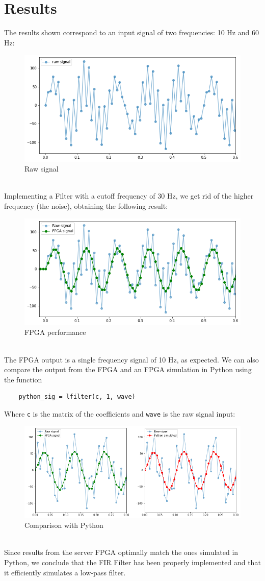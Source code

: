 \documentclass[11pt,a4paper,twocolumn]{IEEEtran}
\begin{document}
	\section{Results}
	The results shown correspond to an input signal of two frequencies: 10 Hz and 60 Hz: 
	\begin{figure}[h]
		\centering
		\includegraphics[width=.9\linewidth]{img/rawsig}
		\caption{Raw signal}
	\end{figure}\\
	Implementing a Filter with a cutoff frequency of 30 Hz, we get rid of the higher frequency (the noise), obtaining the following result:
	\begin{figure}[h]
		\centering
		\includegraphics[width=.9\linewidth]{img/fpgaresult}
		\caption{FPGA performance}
	\end{figure}\\
	The FPGA output is a single frequency signal of 10 Hz, as expected. We can also compare the output from the FPGA and an FPGA simulation in Python using the function
	\begin{lstlisting}
	python_sig = lfilter(c, 1, wave)
	\end{lstlisting}
	Where \texttt{c} is the matrix of the coefficients and \texttt{wave} is the raw signal input:
	\begin{figure}[h]
		\centering
		\includegraphics[width=1\linewidth]{img/fpgapython}
		\caption{Comparison with Python}
	\end{figure}\\
	Since results from the server FPGA optimally match the ones
	simulated in Python, we conclude that the FIR Filter has been properly implemented and that it
	efficiently simulates a low-pass filter.
\end{document}

